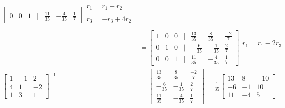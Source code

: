 \documentclass[12pt]{article}
\begin{document}
\begin{enumerate}
\begin{align*}
\begin{bmatrix}
                    \\ 0&0&1 &|&\frac{11}{35}&-\frac{4}{35}&\frac{1}{7}
                \end{bmatrix}\begin{matrix}
                    r_1 = r_1+r_2
                    \\ %
                    \\ r_3=-r_3+4r_2
                    \\ 
                \end{matrix}
            \\ &= \begin{bmatrix}
                    1&0&0 &|& \frac{13}{35}&\frac{8}{35}&\frac{-2}{7}
                    \\ 0&1&0 &|& -\frac{6}{35}&-\frac{1}{35}&\frac{2}{7}
                    \\ 0&0&1 &|&\frac{11}{35}&-\frac{4}{35}&\frac{1}{7}
                \end{bmatrix}\begin{matrix}
                    r_1 = r_1-2r_3
                    \\ %
                    \\ %
                    \\ 
                \end{matrix}
            \\ \begin{bmatrix}
                1&-1&2 \\ 4&1&-2 \\ 1&3&1
                \end{bmatrix}^{-1} 
            &=\begin{bmatrix}
                   \frac{13}{35}&\frac{8}{35}&\frac{-2}{7}
                    \\-\frac{6}{35}&-\frac{1}{35}&\frac{2}{7}
                    \\ \frac{11}{35}&-\frac{4}{35}&\frac{1}{7}
                \end{bmatrix}=  \frac{1}{35}\begin{bmatrix}
                    13&8&-10 \\ -6&-1&10 \\ 11&-4&5
                \end{bmatrix}
        \end{align*}
        

\end{enumerate}
\end{document}
